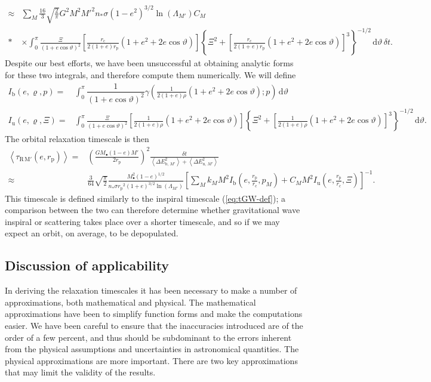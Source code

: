 \documentclass[useAMS,usedcolumn,usegraphicx,usenatbib]{mn2e}
\newcommand{\eqnref}[1]{(\ref{eq:#1})}
\newcommand{\sub}[1]{\ensuremath{_\mathrm{#1}}}
\newcommand{\dd}{\ensuremath{\mathrm{d}}}
\newcommand{\intd}[4]{\ensuremath{\displaystyle \int_{#1}^{#2}{#3}\,\dd{#4}}}
\newcommand{\recip}[1]{\ensuremath{\dfrac{1}{#1}}}
\begin{document}
\begin{onecolumn}
\begin{align}
 \approx {} & \sum_M \frac{16}{3}\sqrt{\frac{2}{\pi}}G^2 M^2{M'}^2n_\ast\sigma\left(1-e^2\right)^{3/2}\ln\left(\Lambda_{M'}\right)C_M \nonumber \\*
 & \times {} \intd{0}{\pi}{\frac{\Xi}{(1 + e \cos\vartheta)^2}\left[\frac{r\sub{c}}{2(1+e)r\sub{p}}\left(1+e^2+2e\cos\vartheta\right)\right]\left\{\Xi^2 + \left[\frac{r\sub{c}}{2(1+e)r\sub{p}}\left(1+e^2+2e\cos\vartheta\right)\right]^3\right\}^{-1/2}}{\vartheta}\,\delta t.
\end{align}
Despite our best efforts, we have been unsuccessful at obtaining analytic forms for these two integrals, and therefore compute them numerically. We will define
\begin{align}
I\sub{b}(e,\varrho,p) = {} & \intd{0}{\pi}{\recip{(1 + e \cos\vartheta)^2}\gamma\left(\frac{1}{2(1+e)\rho}\left(1+e^2+2e\cos\vartheta\right);p\right)}{\vartheta} \\
I\sub{u}(e,\varrho,\Xi) = {} & \intd{0}{\pi}{\frac{\Xi}{(1 + e \cos\vartheta)^2}\left[\frac{1}{2(1+e)\rho}\left(1+e^2+2e\cos\vartheta\right)\right]\left\{\Xi^2 + \left[\frac{1}{2(1+e)\rho}\left(1+e^2+2e\cos\vartheta\right)\right]^3\right\}^{-1/2}}{\vartheta}.
\end{align}
The orbital relaxation timescale is then
\begin{align}
\left\langle\tau\sub{R\,M'}\left(e,r\sub{p}\right)\right\rangle = {} & \left(\frac{GM_\bullet(1 - e)M'}{2r\sub{p}}\right)^2\frac{\delta t}{\left\langle\Delta E^2_{\mathrm{b},\,M'}\right\rangle + \left\langle\Delta E^2_{\mathrm{u},\,M'}\right\rangle} \\
 \approx {} & \frac{3}{64}\sqrt{\frac{\pi}{2}} \frac{M_\bullet^2(1 - e)^{1/2}}{n_\ast \sigma r\sub{p}^2(1 + e)^{3/2}\ln\left(\Lambda_{M'}\right)} \left[\sum_M k_M M^2 I\sub{b}\left(e,\frac{r\sub{p}}{r\sub{c}},p_M\right) + C_M M^2 I\sub{u}\left(e,\frac{r\sub{p}}{r\sub{c}},\Xi\right)\right]^{-1}.
\end{align}
This timescale is defined similarly to the inspiral timescale \eqnref{tGW-def}; a comparison between the two can therefore determine whether gravitational wave inspiral or scattering takes place over a shorter timescale, and so if we may expect an orbit, on average, to be depopulated.

\subsection{Discussion of applicability}

In deriving the relaxation timescales it has been necessary to make a number of approximations, both mathematical and physical. The mathematical approximations have been to simplify function forms and make the computations easier. We have been careful to ensure that the inaccuracies introduced are of the order of a few percent, and thus should be subdominant to the errors inherent from the physical assumptions and uncertainties in astronomical quantities. The physical approximations are more important. There are two key approximations that may limit the validity of the results.


\end{onecolumn}
\end{document}
